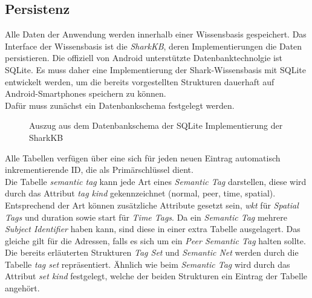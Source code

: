 \subsection{Persistenz}
Alle Daten der Anwendung werden innerhalb einer Wissensbasis gespeichert. Das Interface der Wissensbasis ist die \textit{SharkKB}, deren Implementierungen die Daten persistieren. Die offiziell von Android unterstützte Datenbanktechnolgie ist SQLite. Es muss daher eine Implementierung der Shark-Wissensbasis mit SQLite entwickelt werden, um die bereits vorgestellten Strukturen dauerhaft auf Android-Smartphones speichern zu können. 
\\Dafür muss zunächst ein Datenbankschema festgelegt werden. 
\begin{figure}[H]
	\centering
	\hspace*{1cm}
	\caption{Auszug aus dem Datenbankschema der SQLite Implementierung der SharkKB}
	\label{fig:sharkSQL}
\end{figure}
Alle Tabellen verfügen über eine sich für jeden neuen Eintrag automatisch inkrementierende ID, die als Primärschlüssel dient. \\Die Tabelle \textit{semantic tag} kann jede Art eines \textit{Semantic Tag} darstellen, diese wird durch das Attribut \textit{tag kind} gekennzeichnet (normal, peer, time, spatial). Entsprechend der Art können zusätzliche Attribute gesetzt sein, \textit{wkt} für \textit{Spatial Tags} und duration sowie start für \textit{Time Tags}. Da ein \textit{Semantic Tag} mehrere \textit{Subject Identifier} haben kann, sind diese in einer extra Tabelle ausgelagert. Das gleiche gilt für die Adressen, falls es sich um ein \textit{Peer Semantic Tag} halten sollte. 
\\Die bereits erläuterten Strukturen \textit{Tag Set} und \textit{Semantic Net} werden durch die Tabelle \textit{tag set} repräsentiert. Ähnlich wie beim \textit{Semantic Tag} wird durch das Attribut \textit{set kind} festgelegt, welche der beiden Strukturen ein Eintrag der Tabelle angehört. 
